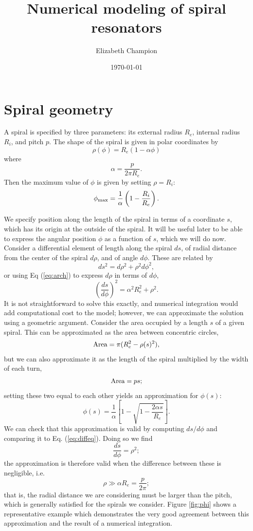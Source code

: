\documentclass[a4paper, amsfonts, amssymb, amsmath, reprint, showkeys, nofootinbib, twoside]{revtex4-1}
\begin{document}
\title{Numerical modeling of spiral resonators}

\author{Elizabeth Champion}

\date{\today} %

\maketitle

\section{Spiral geometry}

A spiral is specified by three parameters: its external radius $R_e$, internal radius $R_i$, and pitch $p$.
The shape of the spiral is given in polar coordinates by
\begin{equation} \label{eq:arch}
    \rho(\phi) = R_e (1 - \alpha \phi)
\end{equation}
where
\[
    \alpha = \frac {p} {2 \pi R_e}.
\]
Then the maximum value of $\phi$ is given by setting $\rho = R_i$:
\[
    \phi_{\rm max} = \frac {1} {\alpha} \left ( 1 - \frac {R_i} {R_e} \right ).
\]

We specify position along the length of the spiral in terms of a coordinate $s$, which has its origin at the outside of the spiral.
It will be useful later to be able to express the angular position $\phi$ as a function of $s$, which we will do now.
Consider a differential element of length along the spiral $ds$, of radial distance from the center of the spiral $d\rho$, and of angle $d\phi$.
These are related by
\[
    ds^2 = d\rho^2 + \rho^2 d\phi^2,
\]
or using Eq (\ref{eq:arch}) to express $d\rho$ in terms of $d\phi$, 
\begin{equation} \label{eq:diffeq}
    \left ( \frac {ds} {d\phi} \right )^2 = \alpha^2 R_e^2 + \rho^2.
\end{equation}
It is not straightforward to solve this exactly, and numerical integration would add computational cost to the model; however, we can approximate the solution using a geometric argument.
Consider the area occupied by a length $s$ of a given spiral.
This can be approximated as the area between concentric circles,
\[
    {\rm Area} = \pi (R_e^2 - \rho(s)^2),
\]
but we can also approximate it as the length of the spiral multiplied by the width of each turn,
\[
    {\rm Area} = p s;
\]
setting these two equal to each other yields an approximation for $\phi(s)$:
\[
    \phi(s) = \frac {1} {\alpha} \left [ 1 - \sqrt{1 - \frac {2 \alpha s} {R_e}} \right ].
\]
We can check that this approximation is valid by computing $ds/d\phi$ and comparing it to Eq. (\ref{eq:diffeq}).
Doing so we find
\[
    \frac {ds} {d\phi} = \rho^2;
\]
the approximation is therefore valid when the difference between these is negligible, i.e.
\[
    \rho \gg \alpha R_e = \frac {p} {2\pi};
\]
that is, the radial distance we are considering must be larger than the pitch, which is generally satisfied for the spirals we consider.
Figure \ref{fig:phi} shows a representative example which demonstrates the very good agreement between this approximation and the result of a numerical integration.
\end{document}
